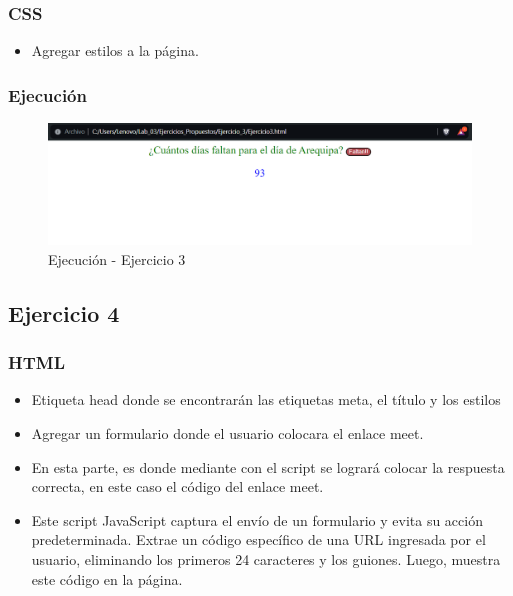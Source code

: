 \documentclass{article}
\begin{document}
		\subsubsection{CSS}
	\begin{itemize}
		\item Agregar estilos a la página.
		
	\end{itemize}
	\subsubsection{Ejecución}
	\begin{figure}[H]
		\centering
		\includegraphics[width=1\textwidth,keepaspectratio]{img/HTML2.png}
		\caption{Ejecución - Ejercicio 3}
	\end{figure}
	\subsection{Ejercicio 4}
	\subsubsection{HTML}
	\begin{itemize}
		\item Etiqueta head donde se encontrarán las etiquetas meta, el título y los estilos  
		
		\newpage
		\item Agregar un formulario donde el usuario colocara el enlace meet.
		
		\item En esta parte, es donde mediante con el script se logrará colocar la respuesta correcta, en este caso el código del enlace meet. 
		
		\item Este script JavaScript captura el envío de un formulario y evita su acción predeterminada. Extrae un código específico de una URL ingresada por el usuario, eliminando los primeros 24 caracteres y los guiones. Luego, muestra este código en la página.
		
	\end{itemize}
\end{document}
